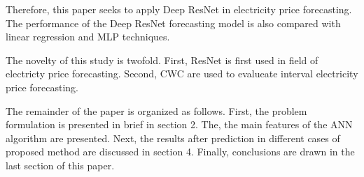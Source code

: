 \documentclass[review]{elsarticle}
\begin{document}
    Therefore, this paper seeks to apply Deep ResNet in electricity price forecasting.
    The performance of the Deep ResNet forecasting model is also compared with linear regression and MLP techniques.

    The novelty of this study is twofold.
    First, ResNet is first used in field of electricty price forecasting.
    Second, CWC are used to evalueate interval electricity price forecasting.


    The remainder of the paper is organized as follows.
    First, the problem formulation is presented in brief in section 2.
    The, the main features of the ANN algorithm are presented.
    Next, the results after prediction in different cases of proposed method  are discussed in section 4.
    Finally, conclusions are drawn in the last section of this paper.
\end{document}
